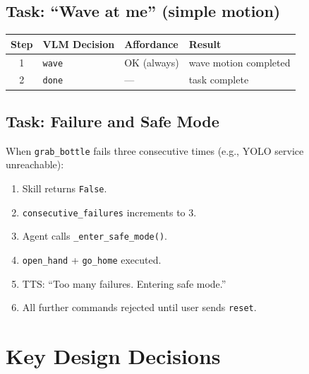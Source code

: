\documentclass[12pt,a4paper]{report}
\begin{document}
\section{Task: ``Wave at me'' (simple motion)}

\begin{center}
\begin{tabular}{clll}
\toprule
\textbf{Step} & \textbf{VLM Decision} & \textbf{Affordance} & \textbf{Result} \\
\midrule
1 & \texttt{wave} & OK (always) & wave motion completed \\
2 & \texttt{done} & — & task complete \\
\bottomrule
\end{tabular}
\end{center}

\section{Task: Failure and Safe Mode}

When \texttt{grab\_bottle} fails three consecutive times
(e.g., YOLO service unreachable):

\begin{enumerate}[noitemsep]
  \item Skill returns \texttt{False}.
  \item \texttt{consecutive\_failures} increments to 3.
  \item Agent calls \texttt{\_enter\_safe\_mode()}.
  \item \texttt{open\_hand} + \texttt{go\_home} executed.
  \item TTS: ``Too many failures. Entering safe mode.''
  \item All further commands rejected until user sends \texttt{reset}.
\end{enumerate}

\chapter{Key Design Decisions}
\end{document}
